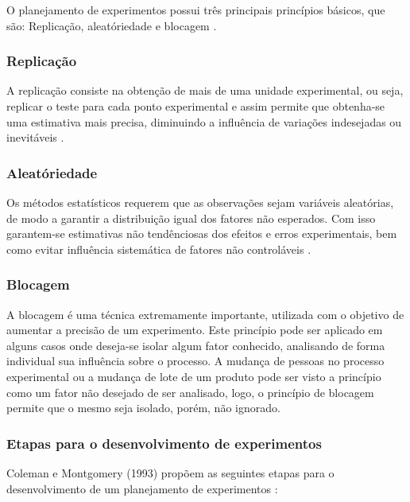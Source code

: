 O planejamento de experimentos possui três principais princípios básicos, que são: Replicação, aleatóriedade e blocagem \cite{2}. 

\subsubsection*{Replicação}

A replicação consiste na obtenção de mais de uma unidade experimental, ou seja, replicar o teste para cada ponto experimental e assim permite que obtenha-se uma estimativa mais precisa, diminuindo a influência de variações indesejadas ou inevitáveis \cite{2}.

\subsubsection*{Aleatóriedade}

Os métodos estatísticos requerem que as observações sejam variáveis aleatórias, de modo a garantir a distribuição igual dos fatores não esperados. Com isso garantem-se estimativas não tendênciosas dos efeitos e erros experimentais, bem como evitar influência sistemática de fatores não controláveis \cite{2}. 
\subsubsection*{Blocagem}

A blocagem é uma técnica extremamente importante, utilizada com o objetivo de aumentar a precisão de um experimento. Este princípio pode ser aplicado em alguns casos onde deseja-se isolar algum fator conhecido, analisando de forma individual sua influência sobre o processo. A mudança de pessoas no processo experimental ou a mudança de lote de um produto pode ser visto a princípio como um fator não desejado de ser analisado, logo, o princípio de blocagem permite que o mesmo seja isolado, porém, não ignorado\cite{2}. 

\subsubsection{Etapas para o desenvolvimento de experimentos}

Coleman e Montgomery (1993) propõem as seguintes etapas para o desenvolvimento de um planejamento de experimentos \cite{3}:

